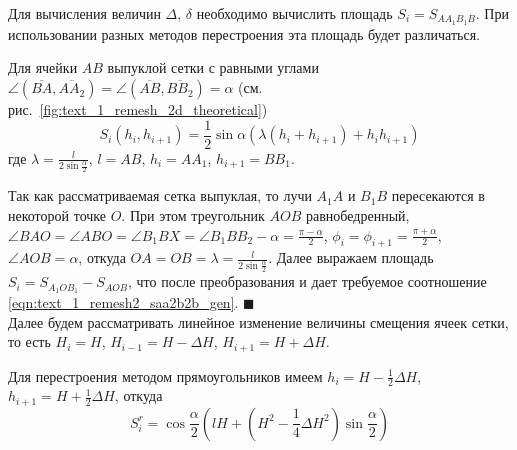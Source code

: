 \documentclass[
11pt,%
tightenlines,%
twoside,%
onecolumn,%
nofloats,%
nobibnotes,%
nofootinbib,%
superscriptaddress,%
noshowpacs,%
centertags]%
{revtex4}
\begin{document}
Для вычисления величин $\Delta$, $\delta$ необходимо вычислить площадь $S_i = S_{AA_1B_1B}$.
При использовании разных методов перестроения эта площадь будет различаться.

\begin{lemma}\label{lem:text_1_remesh2_vypukl_lemma}
Для ячейки $AB$ выпуклой сетки с равными углами $\angle (\overline{BA}, \overline{AA_2}) = \angle (\overline{AB}, \overline{BB_2}) = \alpha$ (см. рис.~\ref{fig:text_1_remesh_2d_theoretical})
\begin{equation}\label{eqn:text_1_remesh2_saa2b2b_gen}
S_i(h_i, h_{i + 1}) = \frac{1}{2} \sin \alpha \left( \lambda(h_i + h_{i+1}) + h_ih_{i+1} \right)
\end{equation}
где $\lambda = \frac{l}{2 \sin \frac{\alpha}{2}}$, $l = AB$, $h_i = AA_1$, $h_{i + 1} = BB_1$.
\end{lemma}

Так как рассматриваемая сетка выпуклая, то лучи $A_1A$ и $B_1B$ пересекаются в некоторой точке $O$.
При этом треугольник $AOB$ равнобедренный, $\angle BAO = \angle ABO = \angle B_1BX = \angle B_1BB_2 - \alpha = \frac{\pi - \alpha}{2}$, $\phi_i = \phi_{i + 1} = \frac{\pi + \alpha}{2}$, $\angle AOB = \alpha$, откуда $OA = OB = \lambda = \frac{l}{2 \sin \frac{\alpha}{2}}$.
Далее выражаем площадь $S_i = S_{A_1OB_1} - S_{AOB}$, что после преобразования и дает требуемое соотношение \eqref{eqn:text_1_remesh2_saa2b2b_gen}.
$\blacksquare$\\

Далее будем рассматривать линейное изменение величины смещения ячеек сетки, то есть $H_i = H$, $H_{i - 1} = H - \Delta H$, $H_{i + 1} = H + \Delta H$.

Для перестроения методом прямоугольников имеем $h_i = H - \frac{1}{2} \Delta H$, $h_{i + 1} = H + \frac{1}{2} \Delta H$, откуда
\begin{equation}\label{eqn:text_1_remesh2_s_rect}
	S_i^r = \cos \frac{\alpha}{2} \left( lH + \left( H^2 - \frac{1}{4} \Delta H^2 \right) \sin \frac{\alpha}{2} \right)
\end{equation}
\end{document}

